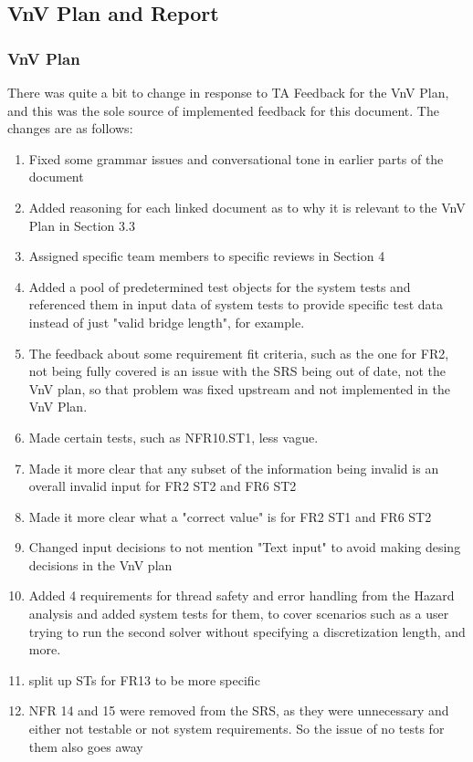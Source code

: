 \documentclass{article}
\begin{document}
\subsection{VnV Plan and Report}

\subsubsection{VnV Plan}
There was quite a bit to change in response to TA Feedback for the VnV Plan, and this was the sole source of implemented feedback for this document. The changes are as follows:
\begin{enumerate}
  \item Fixed some grammar issues and conversational tone in earlier parts of the document
  \item Added reasoning for each linked document as to why it is relevant to the VnV Plan in Section 3.3
  \item Assigned specific team members to specific reviews in Section 4
  \item Added a pool of predetermined test objects for the system tests and referenced them in input data of system tests to provide specific test data instead of just 
  "valid bridge length", for example.
  \item The feedback about some requirement fit criteria, such as the one for FR2, not being fully covered is an issue with the SRS being out of date, not the VnV plan, so that
  problem was fixed upstream and not implemented in the VnV Plan.
  \item Made certain tests, such as NFR10.ST1, less vague.
  \item Made it more clear that any subset of the information being invalid is an overall invalid input for FR2 ST2 and FR6 ST2
  \item Made it more clear what a "correct value" is for FR2 ST1 and FR6 ST2
  \item Changed input decisions to not mention "Text input" to avoid making desing decisions in the VnV plan
  \item Added 4 requirements for thread safety and error handling from the Hazard analysis and added system tests for them, to cover scenarios such as a user trying to run the 
  second solver without specifying a discretization length, and more.
  \item split up STs for FR13 to be more specific
  \item NFR 14 and 15 were removed from the SRS, as they were unnecessary and either not testable or not system requirements. So the issue of no tests for them also goes away
\end{enumerate}
\end{document}
